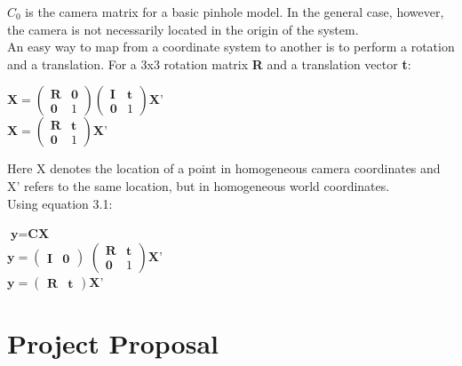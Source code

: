 \documentclass[12pt,a4paper,twoside,openright]{report}
\begin{document}
$C_{0}$ is the camera matrix for a basic pinhole model. In the general case, however,  the camera is not necessarily located in the origin of the system. \\
An easy way to map from a coordinate system to another is to perform a rotation and a translation. For a 3x3 rotation matrix \textbf{R} and a translation vector \textbf{t}:

\begin{center}
	$\textbf{X} = \left ( \begin{array}{c|c} \mathbf{R} & \mathbf{0} \\ \hline  \mathbf{0} & 1 \end{array} \right ) \left ( \begin{array}{c|c} \mathbf{I} & \mathbf{t} \\ \hline \mathbf{0} & 1 \end{array} \right ) \textbf{X'}$ \\ 
\vspace{20pt}
	$\textbf{X} = \left ( \begin{array}{c|c} \mathbf{R} & \mathbf{t} \\ \hline \mathbf{0} & 1 \end{array} \right ) \textbf{X'}$
\end{center}
Here X denotes the location of a point in homogeneous camera coordinates and X' refers to the same location, but in homogeneous world coordinates.\\


Using equation 3.1:
\begin{center}
	$\textbf{y} = \textbf{C} \textbf{X}$\\ 
\vspace{20pt}
	$\textbf{y} = \left ( \begin{array} {c|c} \mathbf{I} & \mathbf{0} \end{array} \right ) $ 
	$ \left ( \begin{array}{c|c} \mathbf{R} & \mathbf{t} \\ \hline \mathbf{0} & 1 \end{array} \right ) \textbf{X'}$ \\ 
\vspace{20pt}	
   $\textbf{y} = \left ( \begin{array} {c|c} \mathbf{R} & \mathbf{t} \end{array} \right ) \textbf{X'}$
	
\end{center} 
\chapter{Project Proposal}

\end{document}
